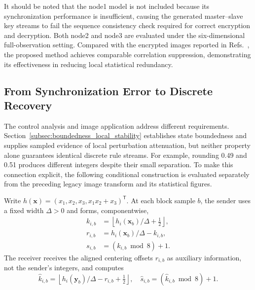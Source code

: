 \documentclass[a4paper,fleqn]{cas-dc}
\theoremstyle{plain}
\theoremstyle{definition}
\begin{document}
It should be noted that the node1 model is not included because its synchronization performance is insufficient, causing the generated master--slave key streams to fail the sequence consistency check required for correct encryption and decryption. Both node2 and node3 are evaluated under the six-dimensional full-observation setting. Compared with the encrypted images reported in Refs.~\cite{li2024novel,verma2025quantum}, the proposed method achieves comparable correlation suppression, demonstrating its effectiveness in reducing local statistical redundancy.


\FloatBarrier
\subsection{From Synchronization Error to Discrete Recovery}
\label{subsec:sync_application_bridge}

The control analysis and image application address different requirements. Section~\ref{subsec:boundedness_local_stability} establishes state boundedness and supplies sampled evidence of local perturbation attenuation, but neither property alone guarantees identical discrete rule streams. For example, rounding 0.49 and 0.51 produces different integers despite their small separation. To make this connection explicit, the following conditional construction is evaluated separately from the preceding legacy image transform and its statistical figures.

Write $h(\mathbf{x})=(x_1,x_2,x_3,x_1x_2+x_3)^{\mathsf T}$. At each block sample $b$, the sender uses a fixed width $\Delta>0$ and forms, componentwise,
\begin{equation}
\begin{aligned}
 k_{i,b}&=\left\lfloor h_i(\mathbf{x}_b)/\Delta+\tfrac12\right\rfloor,\\
 r_{i,b}&=h_i(\mathbf{x}_b)/\Delta-k_{i,b},\\
 s_{i,b}&=(k_{i,b}\bmod8)+1.
\end{aligned}
\label{eq:bridge_sender}
\end{equation}
The receiver receives the aligned centering offsets $r_{i,b}$ as auxiliary information, not the sender's integers, and computes
\begin{equation}
\widehat k_{i,b}=\left\lfloor h_i(\mathbf{y}_b)/\Delta-r_{i,b}+\tfrac12\right\rfloor,
\quad \widehat s_{i,b}=(\widehat k_{i,b}\bmod8)+1.
\label{eq:bridge_receiver}
\end{equation}
\end{document}
